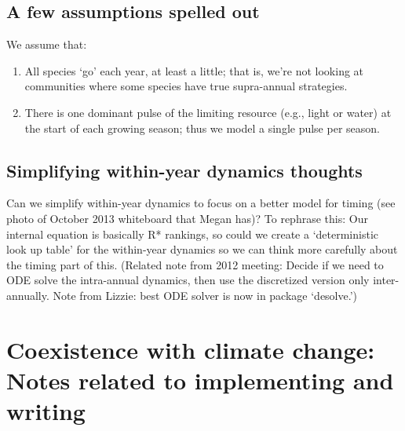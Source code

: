 \documentclass[11pt,a4paper,oneside]{article}
\begin{document}
\subsection{A few assumptions spelled out}
\noindent We assume that:
\begin{enumerate}
\item All species `go' each year, at least a little; that is, we're
  not looking at communities where some species have true
  supra-annual strategies.
\item There is one dominant pulse of the limiting resource (e.g.,
  light or water) at the
  start of each growing season; thus we model a  single pulse per
  season.
\end{enumerate}

\subsection{Simplifying within-year dynamics thoughts}
Can we simplify within-year dynamics to focus on a better model for timing (see photo of October 2013 whiteboard that Megan has)? To rephrase this: Our internal equation is basically R* rankings, so could we create a `deterministic look up table' for the within-year dynamics so we can think more carefully about the timing part of this.  (Related note from 2012 meeting: Decide if we need to ODE solve the intra-annual dynamics, then use the discretized version only inter-annually. Note from Lizzie: best ODE solver is now in package `desolve.')

\section{Coexistence with climate change: Notes related to implementing and writing}\label{genoutline}
\end{document}
